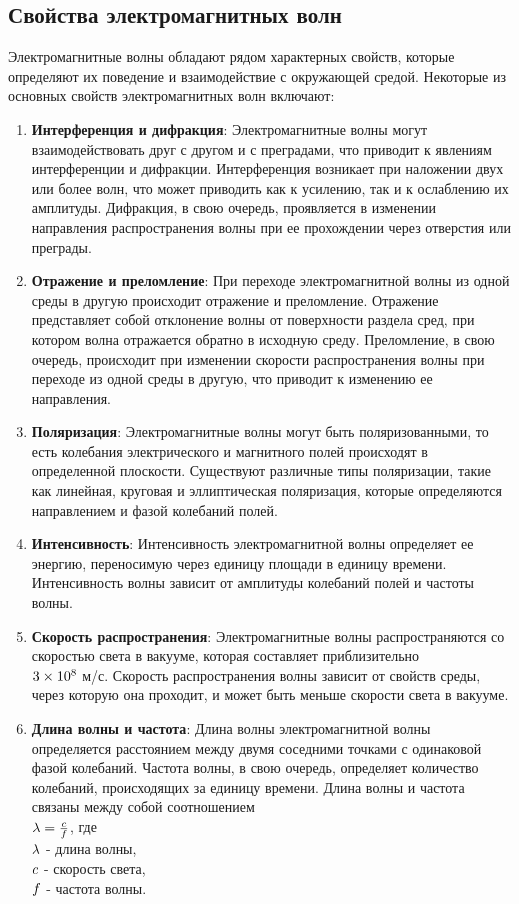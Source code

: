 \documentclass{article}
\begin{document}
\subsection{Свойства электромагнитных волн}
Электромагнитные волны обладают рядом характерных свойств, которые определяют их поведение и взаимодействие с окружающей средой. Некоторые из основных свойств электромагнитных волн включают:
\begin{enumerate}
\item \textbf{Интерференция и дифракция}: Электромагнитные волны могут взаимодействовать друг с другом и с преградами, что приводит к явлениям интерференции и дифракции. Интерференция возникает при наложении двух или более волн, что может приводить как к усилению, так и к ослаблению их амплитуды. Дифракция, в свою очередь, проявляется в изменении направления распространения волны при ее прохождении через отверстия или преграды.
\item \textbf{Отражение и преломление}: При переходе электромагнитной волны из одной среды в другую происходит отражение и преломление. Отражение представляет собой отклонение волны от поверхности раздела сред, при котором волна отражается обратно в исходную среду. Преломление, в свою очередь, происходит при изменении скорости распространения волны при переходе из одной среды в другую, что приводит к изменению ее направления.
\item \textbf{Поляризация}: Электромагнитные волны могут быть поляризованными, то есть колебания электрического и магнитного полей происходят в определенной плоскости. Существуют различные типы поляризации, такие как линейная, круговая и эллиптическая поляризация, которые определяются направлением и фазой колебаний полей.
\item \textbf{Интенсивность}: Интенсивность электромагнитной волны определяет ее энергию, переносимую через единицу площади в единицу времени. Интенсивность волны зависит от амплитуды колебаний полей и частоты волны.
\item \textbf{Скорость распространения}: Электромагнитные волны распространяются со скоростью света в вакууме, которая составляет приблизительно \\$3 \times 10^8\\$ м/с. Скорость распространения волны зависит от свойств среды, через которую она проходит, и может быть меньше скорости света в вакууме.
\item \textbf{Длина волны и частота}: Длина волны электромагнитной волны определяется расстоянием между двумя соседними точками с одинаковой фазой колебаний. Частота волны, в свою очередь, определяет количество колебаний, происходящих за единицу времени. Длина волны и частота связаны между собой соотношением \\$\lambda = \frac{c}{f}\\$, где \\$\lambda\\$ - длина волны, \\$c\\$ - скорость света, \\$f\\$ - частота волны.
\end{enumerate}
\end{document}
